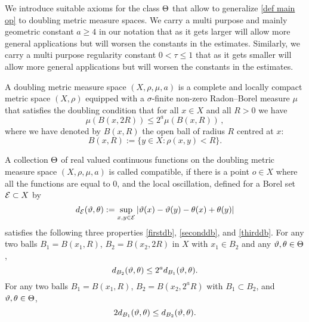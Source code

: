 
We introduce suitable axioms for the class $\Theta$
that allow to generalize \eqref{def main op} to doubling metric measure spaces.
We carry a multi purpose and mainly geometric constant $a\ge 4$ in our notation that as it gets larger will allow more general applications but will worsen the constants in the estimates.
Similarly, we carry a multi purpose regularity constant $0<\tau\le 1$ that as it gets smaller will allow more general applications but will worsen the constants in the estimates.

A doubling metric measure space  $(X,\rho,\mu, a)$ is a complete
and locally compact metric space $(X,\rho)$
equipped with a $\sigma$-finite non-zero Radon--Borel measure $\mu$ that satisfies the doubling condition that for all $x\in X$ and all $R>0$ we have
\begin{equation}\label{doublingx}
    \mu(B(x,2R))\le 2^a\mu(B(x,R))\,,
\end{equation}
where we have denoted by $B(x,R)$ the open ball of radius $R$ centred at $x$:
\begin{equation}\label{eq define ball}
    B(x,R):=\{y\in X: \rho(x,y)<R\}. \end{equation}


A  collection $\Theta$ of real valued continuous functions on the doubling metric measure space $(X,\rho,\mu,a)$ is called compatible, if there is a point $o\in X$ where all the functions are equal to $0$, and the  local oscillation, defined for a Borel set $\mathcal{E}\subset X$ by
\begin{equation}\label{definedE}
    d_{\mathcal{E}}(\vartheta,\theta):=\sup_{x,y\in \mathcal{E}}|\vartheta(x)-{\vartheta(y)}- \theta(x)+{\theta(y)}|
\end{equation}
satisfies the following three properties
\eqref{firstdb}, \eqref{seconddb}, and \eqref{thirddb}.
For any two balls $B_1=B(x_1,R)$, $B_2= B(x_2,2R)$ in $X$ with $x_1\in B_2$  and any $\vartheta,\theta\in \Theta$,
\begin{equation}\label{firstdb}
    d_{B_2}(\vartheta,\theta)\le 2^a d_{B_1}(\vartheta,\theta) .
\end{equation}
For any two balls
$B_1=B(x_1,R)$, $B_2= B(x_2,2^aR)$
with $B_1\subset B_2$, and $\vartheta,\theta\in \Theta$,
\begin{equation}\label{seconddb}
    2d_{B_1}(\vartheta,\theta)
\le d_{B_2}(\vartheta,\theta) .
\end{equation}



